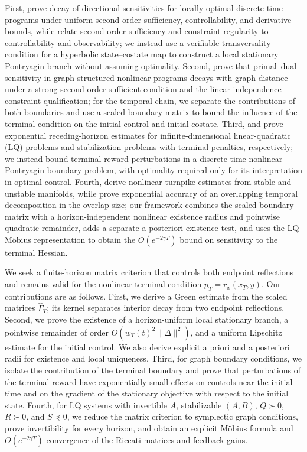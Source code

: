\documentclass[twocolumn,nameyear,amsthm]{autart}
\numberwithin{equation}{section}
\begin{document}
First, \citet{na2020exponential} prove decay of directional sensitivities for
locally optimal discrete-time programs under uniform second-order sufficiency,
controllability, and derivative bounds, while
\citet{shin2021controllability} relate second-order sufficiency and constraint
regularity to controllability and observability; we instead use a
verifiable transversality condition for a hyperbolic state--costate map to
construct a local stationary Pontryagin branch without assuming optimality.
Second, \citet{shin2022exponential} prove that primal--dual sensitivity in
graph-structured nonlinear programs decays with graph distance under a strong second-order sufficient
condition and the linear independence constraint qualification; for the
temporal chain, we separate the contributions of both boundaries and use a
scaled boundary matrix to bound the influence of the terminal condition on the
initial control and initial costate.  Third, \citet{breiten2020turnpike} and
\citet{kunisch2020terminal} prove exponential receding-horizon estimates for
infinite-dimensional linear-quadratic (LQ) problems and stabilization problems
with terminal penalties, respectively; we instead bound terminal reward perturbations in a
discrete-time nonlinear Pontryagin boundary problem, with optimality required
only for its interpretation in optimal control.  Fourth,
\citet{sakamoto2021turnpike} derive nonlinear turnpike estimates from stable and
unstable manifolds, while \citet{xu2018exponentially} prove exponential
accuracy of an overlapping temporal decomposition in the overlap size; our
framework combines the scaled boundary matrix with a horizon-independent
nonlinear existence radius and pointwise quadratic remainder, adds a separate
a posteriori existence test, and uses the LQ M\"obius representation to obtain
the $O(e^{-2\gamma T})$ bound on sensitivity to the terminal Hessian.

We seek a finite-horizon matrix criterion that controls both endpoint
reflections and remains valid for the nonlinear terminal condition
$p_T=r_x(x_T,y)$.  Our contributions are as follows.  First, we derive a Green
estimate from the scaled matrices $\widehat\Gamma_T$; its kernel separates
interior decay from two endpoint reflections.  Second, we prove the existence
of a horizon-uniform local stationary branch, a pointwise remainder of order
$O(w_T(t)^2\|\Delta\|^2)$, and a uniform Lipschitz estimate for the initial
control.  We also derive explicit a priori and a posteriori radii for existence
and local uniqueness.  Third, for graph boundary conditions, we isolate the
contribution of the terminal boundary and prove that perturbations of the
terminal reward have exponentially small effects on controls near the initial
time and on the gradient of the stationary objective with respect to the
initial state.  Fourth,
for LQ systems with invertible $A$, stabilizable $(A,B)$, $Q\succ0$, $R\succ0$, and
$S\preceq0$, we reduce the matrix criterion to symplectic graph conditions,
prove invertibility for every horizon, and obtain an explicit M\"obius formula
and $O(e^{-2\gamma T})$ convergence of the Riccati matrices and feedback gains.
\end{document}
